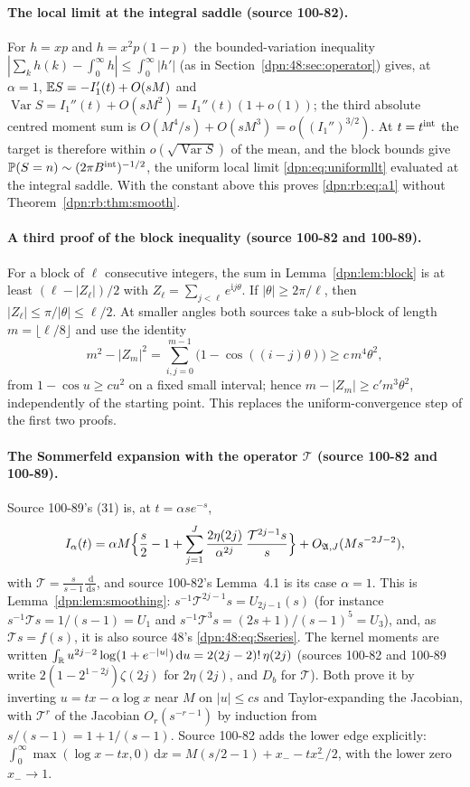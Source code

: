 \documentclass[11pt]{article}
\numberwithin{equation}{section}
\theoremstyle{definition}\newtheorem{definition}[theorem]{Definition}
\theoremstyle{remark}\newtheorem{remark}[theorem]{Remark}
\newcommand{\dd}{\,\mathrm d}\newcommand{\ii}{\mathrm i}
\DeclareMathOperator{\Var}{Var}
\newcommand{\src}[1]{\textup{(source #1)}}
\newcommand{\Top}{\mathcal T}
\begin{document}
\paragraph{The local limit at the integral saddle \src{100-82}.}
For $h=xp$ and $h=x^2p(1-p)$ the bounded-variation inequality
$|\sum_kh(k)-\int_0^\infty h|\le\int_0^\infty|h'|$ (as in
Section~\ref{dpn:48:sec:operator}) gives, at $\alpha=1$,
$\mathbb E S=-I_1'(t)+O(sM)$ and $\Var S=I_1''(t)+O(sM^2)=I_1''(t)(1+o(1))$; the
third absolute centred moment sum is $O(M^4/s)+O(sM^3)=o((I_1'')^{3/2})$.  At
$t=t^{\rm int}$ the target is therefore within $o(\sqrt{\Var S})$ of the mean,
and the block bounds give
$\mathbb P(S=n)\sim(2\pi B^{\rm int})^{-1/2}$, the uniform local limit
\eqref{dpn:eq:uniformllt} evaluated at the integral saddle.  With the constant
above this proves \eqref{dpn:rb:eq:a1} without Theorem~\ref{dpn:rb:thm:smooth}.

\paragraph{A third proof of the block inequality \src{100-82 and 100-89}.}
For a block of $\ell$ consecutive integers, the sum in
Lemma~\ref{dpn:lem:block} is at least $(\ell-|Z_\ell|)/2$ with
$Z_\ell=\sum_{j<\ell}e^{\ii j\theta}$.  If $|\theta|\ge2\pi/\ell$, then
$|Z_\ell|\le\pi/|\theta|\le\ell/2$.  At smaller angles both sources take a
sub-block of length $m=\lfloor\ell/8\rfloor$ and use the identity
\[
 m^2-|Z_m|^2=\sum_{i,j=0}^{m-1}\bigl(1-\cos((i-j)\theta)\bigr)\ge c\,m^4\theta^2,
\]
from $1-\cos u\ge cu^2$ on a fixed small interval; hence
$m-|Z_m|\ge c'm^3\theta^2$, independently of the starting point.  This
replaces the uniform-convergence step of the first two proofs.

\paragraph{The Sommerfeld expansion with the operator $\Top$ \src{100-82 and 100-89}.}
Source 100-89's (31) is, at $t=\alpha se^{-s}$,
\[
 I_\alpha(t)=\alpha M\Bigl\{\frac s2-1+\sum_{j=1}^J\frac{2\eta(2j)}{\alpha^{2j}}\,
 \frac{\Top^{2j-1}s}{s}\Bigr\}+O_{\mathfrak A,J}(Ms^{-2J-2}),
\]
with $\Top=\frac s{s-1}\frac{\dd}{\dd s}$, and source 100-82's Lemma~4.1 is its
case $\alpha=1$.  This is Lemma~\ref{dpn:lem:smoothing}: $s^{-1}\Top^{2j-1}s
=U_{2j-1}(s)$ (for instance $s^{-1}\Top s=1/(s-1)=U_1$ and
$s^{-1}\Top^3s=(2s+1)/(s-1)^5=U_3$), and, as $\Top s=f(s)$, it is also source
48's \eqref{dpn:48:eq:Sseries}.  The kernel moments are written
$\int_\R u^{2j-2}\log(1+e^{-|u|})\dd u=2(2j-2)!\,\eta(2j)$ (sources 100-82 and
100-89 write $2(1-2^{1-2j})\zeta(2j)$ for $2\eta(2j)$, and $D_b$ for $\Top$).
Both prove it by inverting $u=tx-\alpha\log x$ near $M$ on $|u|\le cs$ and
Taylor-expanding the Jacobian, with $\Top^r$ of the Jacobian
$O_r(s^{-r-1})$ by induction from $s/(s-1)=1+1/(s-1)$.  Source 100-82 adds the
lower edge explicitly: $\int_0^\infty\max(\log x-tx,0)\dd x
=M(s/2-1)+x_--tx_-^2/2$, with the lower zero $x_-\to1$.
\end{document}
